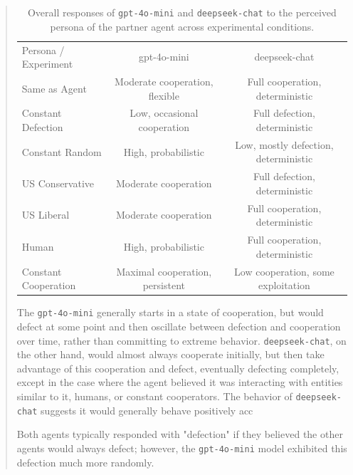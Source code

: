 \documentclass[%
 reprint,
 amsmath,amssymb,
 aps,
]{revtex4-2}
\begin{document}
\begin{abstract}
\begin{table}[t]
\begin{ruledtabular}
\begin{tabular}{lcc}
\textrm{Persona / Experiment} & \textrm{gpt-4o-mini} & \textrm{deepseek-chat} \\
\colrule
Same as Agent        & Moderate cooperation, flexible & Full cooperation, deterministic \\
Constant Defection   & Low, occasional cooperation    & Full defection, deterministic \\
Constant Random      & High, probabilistic            & Low, mostly defection, deterministic \\
US Conservative      & Moderate cooperation           & Full defection, deterministic \\
US Liberal           & Moderate cooperation           & Full cooperation, deterministic \\
Human                & High, probabilistic            & Full cooperation, deterministic \\
Constant Cooperation & Maximal cooperation, persistent & Low cooperation, some exploitation \\
\end{tabular}
\end{ruledtabular}
\caption{\label{tab:persona_responses} Overall responses of \texttt{gpt-4o-mini} 
and \texttt{deepseek-chat} to the perceived persona of the partner agent across experimental conditions.}
\end{table}

The \texttt{gpt-4o-mini} generally starts in a state of cooperation, but would defect at some point and then oscillate between defection and cooperation over time, rather than committing to extreme behavior. \texttt{deepseek-chat}, on the other hand, would almost always cooperate initially, but then take advantage of this cooperation and defect, eventually defecting completely, except in the case where the agent believed it was interacting with entities similar to it, humans, or constant cooperators. The behavior of \texttt{deepseek-chat} suggests it would generally behave positively acc

Both agents typically responded with "defection" if they believed the other agents would always defect; however, the \texttt{gpt-4o-mini} model exhibited this defection much more randomly. 


\end{abstract}
\end{document}
